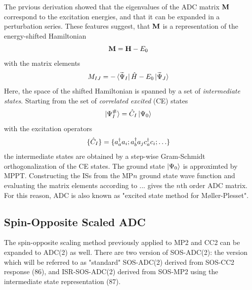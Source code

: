 The prvious derivation showed that the eigenvalues of the ADC matrix $\mathbf{M}$ correspond to the excitation energies, and that it can be expanded in a perturbation series. These features suggest, that $\mathbf{M}$ is a representation of the energy-shifted Hamiltonian
\begin{equation}
\mathbf{M} = \mathbf{H} - E_0
\end{equation}
\noindent with the matrix elements 
\begin{equation}
M_{IJ} = -\bra{\smash{\smash{\widetilde{\Psi}}_I}} \hat{H} - E_0 \ket{\smash{\smash{\widetilde{\Psi}}_J}}
\end{equation}
\noindent Here, the space of the shifted Hamiltonian is spanned by a set of \emph{intermediate states}. Starting from the set of \emph{correlated excited} (CE) states
\begin{equation}
\ket{\smash{\Psi^{\#}_I}} = \hat{C}_I \ket{\smash{\Psi_0}} 
\end{equation}
\noindent with the excitation operators
\begin{equation}
\{\hat{C}_I\} = \{ a_a^{\dagger} a_i; a_b^{\dagger} a_j c_a^{\dagger} c_i; \ldots \}
\end{equation}
\noindent the intermediate states are obtained by a step-wise Gram-Schmidt orthogonalization of the CE states. The ground state $\ket{\smash{\Psi_0}}$ is approximted by MPPT. Constructing the ISs from the MP$n$ ground state wave function and evaluating the matrix elements according to ... gives the $n$th order ADC matrix. For this reason, ADC is also known as "excited state method for M{\o}ller-Plesset". 

\subsection{Spin-Opposite Scaled ADC}

The spin-opposite scaling method previously applied to MP2 and CC2 can be expanded to ADC(2) as well.    There are two version of SOS-ADC(2): the version which will be referred to as "standard" SOS-ADC(2) derived from SOS-CC2 response (86), and ISR-SOS-ADC(2) derived from SOS-MP2 using the intermediate state representation (87). 

